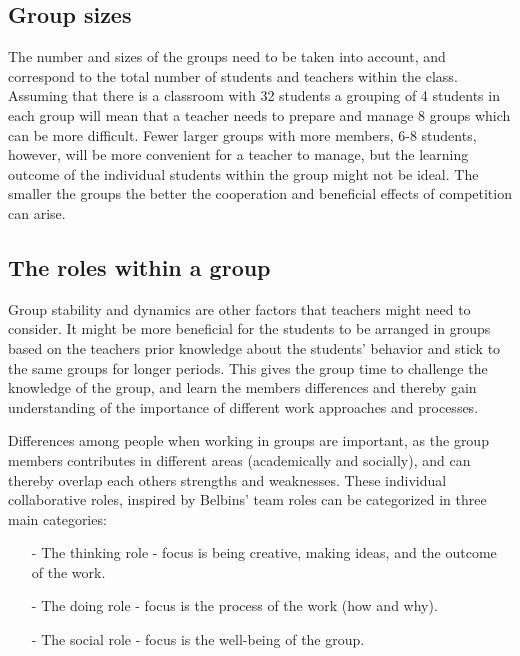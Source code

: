 \subsection{Group sizes}\label{GroupArrangement}
The number and sizes of the groups need to be taken into account, and correspond to the total number of students and teachers within the class. Assuming that there is a classroom with 32 students a grouping of 4 students in each group will mean that a teacher needs to prepare and manage 8 groups which can be more difficult. Fewer larger groups with more members, 6-8 students, however, will be more convenient for a teacher to manage, but the learning outcome of the individual students within the group might not be ideal\cite{collaborationSocialPedagogy}. The smaller the groups the better the cooperation and beneficial effects of competition can arise\cite{collaborationCompetitionGames}.

\subsection{The roles within a group}
Group stability and dynamics are other factors that teachers might need to consider. It might be more beneficial for the students to be arranged in groups based on the teachers prior knowledge about the students' behavior and stick to the same groups for longer periods\cite{collaborationSocialPedagogy}. This gives the group time to challenge the knowledge of the group, and learn the members differences and thereby gain understanding of the importance of different work approaches and processes\cite{laeringIPraksis}.

Differences among people when working in groups are important, as the group members contributes in different areas (academically and socially), and can thereby overlap each others strengths and weaknesses\cite{ProjektarbejdesKompleksitet}. These individual collaborative roles, inspired by Belbins' team roles\cite{ProjektarbejdesKompleksitet} can be categorized in three main categories: 
\begin{itemize}
	\item[-] The thinking role - focus is being creative, making ideas, and the outcome of the work. 
	\item[-] The doing role - focus is the process of the work (how and why).
	\item[-] The social role - focus is the well-being of the group. 
\end{itemize}

